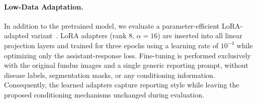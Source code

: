\documentclass[runningheads]{llncs}
\begin{document}
\paragraph{Low-Data Adaptation.}


In addition to the pretrained model, we evaluate a parameter-efficient \gls{LoRA}-adapted variant~\cite{hu2022lora}. \gls{LoRA} adapters (rank $8$, $\alpha=16$) are inserted into all linear projection layers and trained for three epochs using a learning rate of $10^{-4}$ while optimizing only the assistant-response loss. Fine-tuning is performed exclusively with the original fundus images and a single generic reporting prompt, without disease labels, segmentation masks, or any conditioning information. Consequently, the learned adapters capture reporting style while leaving the proposed conditioning mechanisms unchanged during evaluation.

\end{document}
